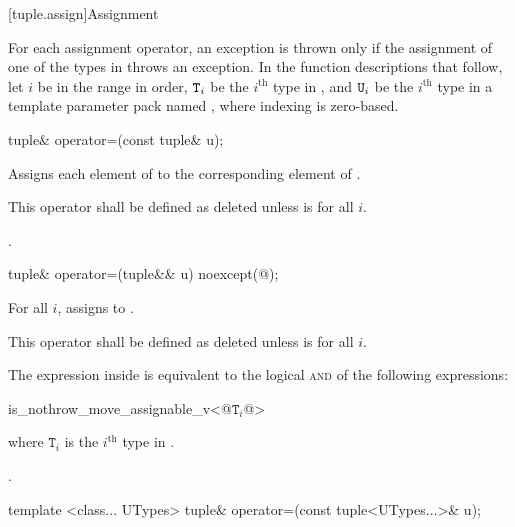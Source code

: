 [tuple.assign]{Assignment}

\pnum
For each  assignment operator, an exception is thrown only if the
assignment of one of the types in  throws an exception.
In the function descriptions that follow, let $i$ be in the range 
in order, $\texttt{T}_i$ be the $i^\text{th}$ type in ,
and $\texttt{U}_i$ be the $i^\text{th}$ type in a
template parameter pack named , where indexing is zero-based.

%
\begin{itemdecl}
tuple& operator=(const tuple& u);
\end{itemdecl}

\begin{itemdescr}
\pnum
\effects Assigns each element of  to the corresponding
element of .

\pnum
\remarks This operator shall be defined as deleted unless
 is  for all $i$.

\pnum
\returns {}.
\end{itemdescr}

%
\begin{itemdecl}
tuple& operator=(tuple&& u) noexcept(@\seebelow@);
\end{itemdecl}

\begin{itemdescr}
\pnum
\effects For all $i$, assigns  to
.

\pnum
\remarks This operator shall be defined as deleted unless
 is  for all $i$.

\pnum
\remarks The expression inside  is equivalent to the logical \textsc{and} of the
following expressions:

\begin{codeblock}
is_nothrow_move_assignable_v<@$\mathtt{T}_i$@>
\end{codeblock}
where $\mathtt{T}_i$ is the $i^\text{th}$ type in .

\pnum
\returns {}.
\end{itemdescr}

%
\begin{itemdecl}
template <class... UTypes> tuple& operator=(const tuple<UTypes...>& u);
\end{itemdecl}

